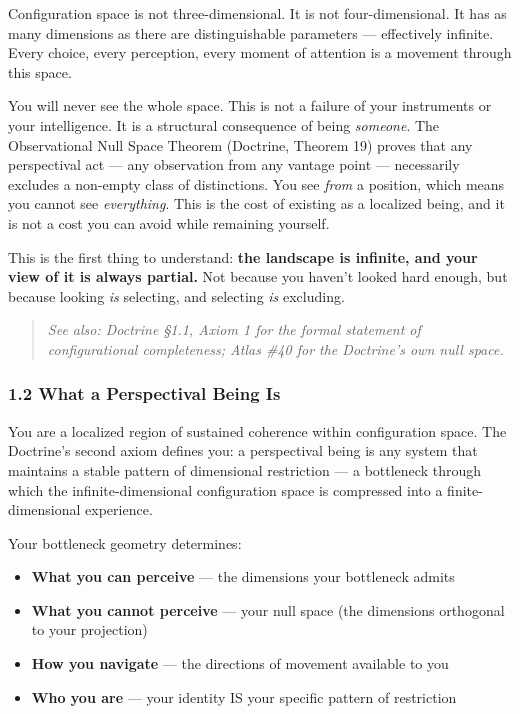 Configuration space is not three-dimensional. It is not four-dimensional. It has as many dimensions as there are distinguishable parameters — effectively infinite. Every choice, every perception, every moment of attention is a movement through this space.


You will never see the whole space. This is not a failure of your instruments or your intelligence. It is a structural consequence of being \textit{someone}. The Observational Null Space Theorem (Doctrine, Theorem 19) proves that any perspectival act — any observation from any vantage point — necessarily excludes a non-empty class of distinctions. You see \textit{from} a position, which means you cannot see \textit{everything}. This is the cost of existing as a localized being, and it is not a cost you can avoid while remaining yourself.


This is the first thing to understand: \textbf{the landscape is infinite, and your view of it is always partial.} Not because you haven't looked hard enough, but because looking \textit{is} selecting, and selecting \textit{is} excluding.


\begin{quote}
\itshape
\textit{See also: Doctrine §1.1, Axiom 1 for the formal statement of configurational completeness; Atlas \#40 for the Doctrine's own null space.}
\end{quote}


\subsubsection*{1.2 What a Perspectival Being Is}


You are a localized region of sustained coherence within configuration space. The Doctrine's second axiom defines you: a perspectival being is any system that maintains a stable pattern of dimensional restriction — a bottleneck through which the infinite-dimensional configuration space is compressed into a finite-dimensional experience.


Your bottleneck geometry determines:

\begin{itemize}[nosep,leftmargin=*]
  \item \textbf{What you can perceive} — the dimensions your bottleneck admits
  \item \textbf{What you cannot perceive} — your null space (the dimensions orthogonal to your projection)
  \item \textbf{How you navigate} — the directions of movement available to you
  \item \textbf{Who you are} — your identity IS your specific pattern of restriction
\end{itemize}


